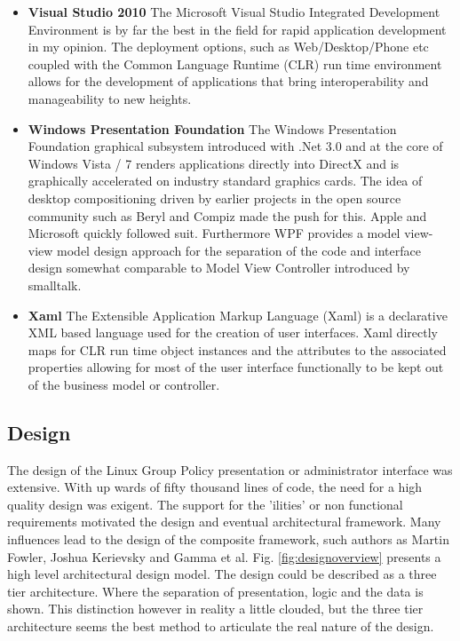 \begin{itemize}
			\item \textbf{Visual Studio 2010}		
				\newline							
				The Microsoft Visual Studio Integrated Development Environment is by far the best in the field for rapid application 
				development in my opinion.  The deployment options, such as Web/Desktop/Phone etc
				coupled with the Common Language Runtime (CLR) run time environment allows for the development of applications that bring interoperability and manageability
				to new heights.
				
			\item \textbf{Windows Presentation Foundation}	
				\newline								
				The Windows Presentation Foundation graphical subsystem introduced with .Net 3.0 and at the core of Windows Vista / 7 
				renders applications directly into DirectX and is graphically accelerated on industry standard graphics cards.  The 
				idea of desktop compositioning driven by earlier projects in the open source community such as Beryl and Compiz
				made the push for this.  Apple and Microsoft quickly followed suit.  Furthermore WPF provides a model view-view model 
				design approach for the separation of the code and interface design somewhat comparable to Model View Controller introduced
				by smalltalk.
				
			\item \textbf{Xaml}		
				\newline							
				The Extensible Application Markup Language (Xaml) is a declarative XML based language used for the creation of user interfaces.
				Xaml directly maps for CLR run time object instances and the attributes to the associated properties allowing for most of the
				user interface functionally to be kept out of the business model or controller.
				
		\end{itemize}			
		
	\subsection{Design}
	
		\normalsize
		{	
			The design of the Linux Group Policy presentation or administrator interface was extensive.  With up wards of fifty 
			thousand lines of code, the need for a high quality design was exigent.  The support for the 'ilities' or non functional requirements
			motivated the design and eventual architectural framework.   Many influences lead to the design of the composite framework, such authors 
			as Martin Fowler, Joshua Kerievsky and Gamma et al.
			\newline	
			\newline
			Fig. \ref{fig:designoverview} presents a high level architectural design model.
			The design could be described as a three tier architecture.  Where the separation of presentation, logic and the data is shown.
			This distinction however in reality a little clouded, but the three tier architecture seems the best method to articulate the real nature
			of the design.	
			\newline
			\newline			
		}

